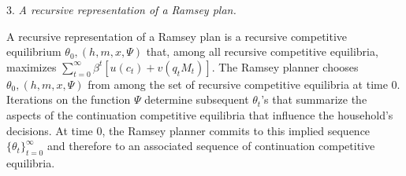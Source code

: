 \medskip
\item{3.} {\it A recursive representation of a Ramsey plan.}
\medskip

\noindent A recursive representation of a Ramsey plan is a recursive competitive equilibrium
$\theta_0, (h, m, x, \Psi)$ that, among all recursive competitive equilibria,   maximizes
$ \sum_{t=0}^\infty \beta^t \left[ u(c_t) + v(q_t M_t ) \right] $. The Ramsey planner chooses  $\theta_0, (h, m, x, \Psi)$ from
among the set of recursive competitive equilibria at time $0$.  Iterations on the function $\Psi$ determine subsequent $\theta_t$'s that summarize
the aspects of the continuation competitive equilibria that influence the household's decisions.  At time $0$, the Ramsey planner
commits to this implied sequence $\{\theta_t\}_{t=0}^\infty$ and therefore to an associated sequence of continuation competitive equilibria.
%
%
%


